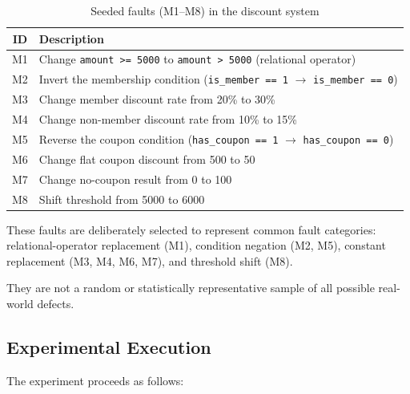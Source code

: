 \documentclass[conference]{IEEEtran}
\begin{document}
\begin{table}[!t]

\centering

\caption{Seeded faults (M1--M8) in the discount system}

\label{tab:mutants}

\begin{tabular}{|c|L{5.8cm}|}
\hline
\textbf{ID} & \textbf{Description} \\
\hline
M1 & Change \texttt{amount >= 5000} to \texttt{amount > 5000} (relational operator) \\
M2 & Invert the membership condition (\texttt{is\_member == 1} $\to$ \texttt{is\_member == 0}) \\
M3 & Change member discount rate from 20\% to 30\% \\
M4 & Change non-member discount rate from 10\% to 15\% \\
M5 & Reverse the coupon condition (\texttt{has\_coupon == 1} $\to$ \texttt{has\_coupon == 0}) \\
M6 & Change flat coupon discount from 500 to 50 \\
M7 & Change no-coupon result from 0 to 100 \\
M8 & Shift threshold from 5000 to 6000 \\
\hline
\end{tabular}

\end{table}



These faults are deliberately selected to represent common fault categories: relational-operator replacement (M1), condition negation (M2, M5), constant replacement (M3, M4, M6, M7), and threshold shift (M8).

They are not a random or statistically representative sample of all possible real-world defects.



\subsection{Experimental Execution}

\label{sec:execution}

The experiment proceeds as follows:
\end{document}
